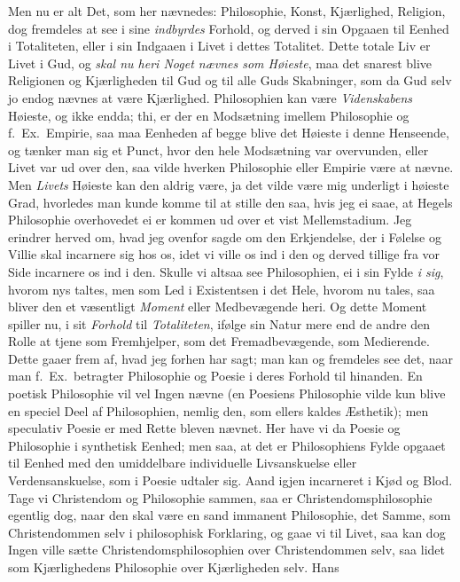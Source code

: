 \documentclass[12pt,a4paper]{book}
\newcommand{\apage}[1]{\marginnote{\footnotesize\textit{[#1]}}}
\begin{document}
Men nu er alt Det, som her nævnedes: Philosophie, Konst, Kjærlighed, Religion,
dog fremdeles at see i sine \emph{indbyrdes} Forhold, og derved i sin Opgaaen til
Eenhed i Totaliteten, eller i sin Indgaaen i Livet i dettes Totalitet. Dette
totale Liv er Livet i Gud, og \emph{skal nu heri Noget nævnes som Høieste}, \apage{118} maa det
snarest blive Religionen og Kjærligheden til Gud og til alle Guds Skabninger,
som da Gud selv jo endog nævnes at være Kjærlighed. Philosophien kan være
\emph{Videnskabens} Høieste, og ikke endda; thi, er der en Modsætning imellem
Philosophie og f.\ Ex.\ Empirie, saa maa Eenheden af begge blive det Høieste i
denne Henseende, og tænker man sig et Punct, hvor den hele Modsætning var
overvunden, eller Livet var ud over den, saa vilde hverken Philosophie eller
Empirie være at nævne. Men \emph{Livets} Høieste kan den aldrig være, ja det
vilde være mig underligt i høieste Grad, hvorledes man kunde komme til at
stille den saa, hvis jeg ei saae, at Hegels Philosophie overhovedet ei er
kommen ud over et vist Mellemstadium. Jeg erindrer herved om, hvad jeg ovenfor
sagde om den Erkjendelse, der i Følelse og Villie skal incarnere sig hos os,
idet vi ville os ind i den og derved tillige fra vor Side incarnere os ind i
den. Skulle vi altsaa see Philosophien, ei i sin Fylde \emph{i sig}, hvorom nys
taltes, men som Led i Existentsen i det Hele, hvorom nu tales, saa bliver den
et væsentligt \emph{Moment} eller Medbevægende heri. Og dette Moment spiller nu, i
sit \emph{Forhold} til \emph{Totaliteten}, ifølge sin Natur mere end de andre den Rolle at
tjene som Fremhjelper, som det Fremadbevægende, som Medierende. Dette gaaer
frem af, hvad jeg forhen har sagt; man kan og fremdeles see det, naar man f.\
Ex.\ betragter Philosophie og Poesie i deres Forhold til hinanden. En poetisk
Philosophie vil vel Ingen nævne (en Poesiens Philosophie vilde kun blive en
speciel Deel af Philosophien, nemlig den, som ellers kaldes Æsthetik); men
speculativ Poesie er med Rette bleven nævnet. Her have vi da Poesie og
Philosophie i synthetisk Eenhed; men saa, at det er Philosophiens Fylde
opgaaet til Eenhed med den umiddelbare individuelle Livsanskuelse eller
Verdensanskuelse, som i Poesie udtaler sig. Aand igjen incarneret i Kjød og
Blod. Tage vi \apage{119} Christendom og Philosophie sammen, saa er Christendomsphilosophie
egentlig dog, naar den skal være en sand immanent Philosophie, det Samme, som
Christendommen selv i philosophisk Forklaring, og gaae vi til Livet, saa kan
dog Ingen ville sætte Christendomsphilosophien over Christendommen selv, saa
lidet som Kjærlighedens Philosophie over Kjærligheden selv. Hans
\end{document}
